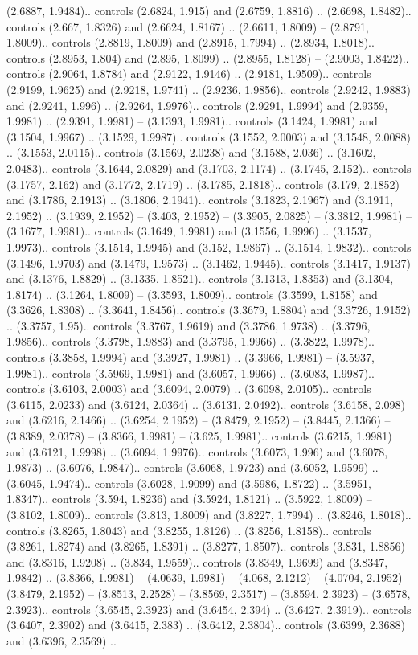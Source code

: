 (2.6887, 1.9484).. controls (2.6824, 1.915) and (2.6759, 1.8816) .. (2.6698, 1.8482).. controls (2.667, 1.8326) and (2.6624, 1.8167) .. (2.6611, 1.8009) -- (2.8791, 1.8009).. controls (2.8819, 1.8009) and (2.8915, 1.7994) .. (2.8934, 1.8018).. controls (2.8953, 1.804) and (2.895, 1.8099) .. (2.8955, 1.8128) -- (2.9003, 1.8422).. controls (2.9064, 1.8784) and (2.9122, 1.9146) .. (2.9181, 1.9509).. controls (2.9199, 1.9625) and (2.9218, 1.9741) .. (2.9236, 1.9856).. controls (2.9242, 1.9883) and (2.9241, 1.996) .. (2.9264, 1.9976).. controls (2.9291, 1.9994) and (2.9359, 1.9981) .. (2.9391, 1.9981) -- (3.1393, 1.9981).. controls (3.1424, 1.9981) and (3.1504, 1.9967) .. (3.1529, 1.9987).. controls (3.1552, 2.0003) and (3.1548, 2.0088) .. (3.1553, 2.0115).. controls (3.1569, 2.0238) and (3.1588, 2.036) .. (3.1602, 2.0483).. controls (3.1644, 2.0829) and (3.1703, 2.1174) .. (3.1745, 2.152).. controls (3.1757, 2.162) and (3.1772, 2.1719) .. (3.1785, 2.1818).. controls (3.179, 2.1852) and (3.1786, 2.1913) .. (3.1806, 2.1941).. controls (3.1823, 2.1967) and (3.1911, 2.1952) .. (3.1939, 2.1952) -- (3.403, 2.1952) -- (3.3905, 2.0825) -- (3.3812, 1.9981) -- (3.1677, 1.9981).. controls (3.1649, 1.9981) and (3.1556, 1.9996) .. (3.1537, 1.9973).. controls (3.1514, 1.9945) and (3.152, 1.9867) .. (3.1514, 1.9832).. controls (3.1496, 1.9703) and (3.1479, 1.9573) .. (3.1462, 1.9445).. controls (3.1417, 1.9137) and (3.1376, 1.8829) .. (3.1335, 1.8521).. controls (3.1313, 1.8353) and (3.1304, 1.8174) .. (3.1264, 1.8009) -- (3.3593, 1.8009).. controls (3.3599, 1.8158) and (3.3626, 1.8308) .. (3.3641, 1.8456).. controls (3.3679, 1.8804) and (3.3726, 1.9152) .. (3.3757, 1.95).. controls (3.3767, 1.9619) and (3.3786, 1.9738) .. (3.3796, 1.9856).. controls (3.3798, 1.9883) and (3.3795, 1.9966) .. (3.3822, 1.9978).. controls (3.3858, 1.9994) and (3.3927, 1.9981) .. (3.3966, 1.9981) -- (3.5937, 1.9981).. controls (3.5969, 1.9981) and (3.6057, 1.9966) .. (3.6083, 1.9987).. controls (3.6103, 2.0003) and (3.6094, 2.0079) .. (3.6098, 2.0105).. controls (3.6115, 2.0233) and (3.6124, 2.0364) .. (3.6131, 2.0492).. controls (3.6158, 2.098) and (3.6216, 2.1466) .. (3.6254, 2.1952) -- (3.8479, 2.1952) -- (3.8445, 2.1366) -- (3.8389, 2.0378) -- (3.8366, 1.9981) -- (3.625, 1.9981).. controls (3.6215, 1.9981) and (3.6121, 1.9998) .. (3.6094, 1.9976).. controls (3.6073, 1.996) and (3.6078, 1.9873) .. (3.6076, 1.9847).. controls (3.6068, 1.9723) and (3.6052, 1.9599) .. (3.6045, 1.9474).. controls (3.6028, 1.9099) and (3.5986, 1.8722) .. (3.5951, 1.8347).. controls (3.594, 1.8236) and (3.5924, 1.8121) .. (3.5922, 1.8009) -- (3.8102, 1.8009).. controls (3.813, 1.8009) and (3.8227, 1.7994) .. (3.8246, 1.8018).. controls (3.8265, 1.8043) and (3.8255, 1.8126) .. (3.8256, 1.8158).. controls (3.8261, 1.8274) and (3.8265, 1.8391) .. (3.8277, 1.8507).. controls (3.831, 1.8856) and (3.8316, 1.9208) .. (3.834, 1.9559).. controls (3.8349, 1.9699) and (3.8347, 1.9842) .. (3.8366, 1.9981) -- (4.0639, 1.9981) -- (4.068, 2.1212) -- (4.0704, 2.1952) -- (3.8479, 2.1952) -- (3.8513, 2.2528) -- (3.8569, 2.3517) -- (3.8594, 2.3923) -- (3.6578, 2.3923).. controls (3.6545, 2.3923) and (3.6454, 2.394) .. (3.6427, 2.3919).. controls (3.6407, 2.3902) and (3.6415, 2.383) .. (3.6412, 2.3804).. controls (3.6399, 2.3688) and (3.6396, 2.3569) .. 